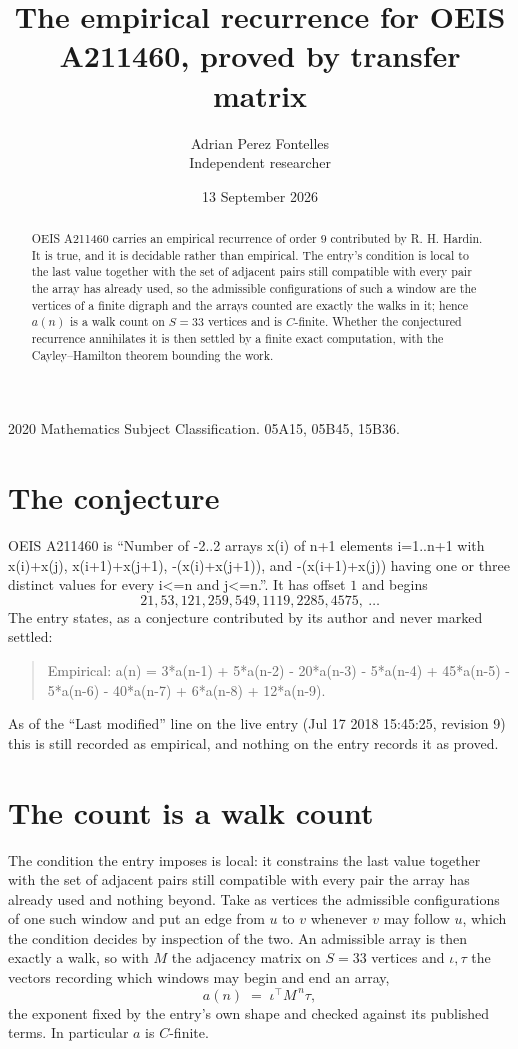 \documentclass[11pt,a4paper]{article}
\title{The empirical recurrence for OEIS A211460, proved by transfer matrix}
\author{Adrian Perez Fontelles\\ \small Independent researcher}
\date{13 September 2026}
\theoremstyle{plain}
\theoremstyle{definition}
\begin{document}
\maketitle

\begin{abstract}
OEIS A211460 carries an empirical recurrence of order $9$ contributed by R. H. Hardin. It is
true, and it is decidable rather than empirical. The entry's condition is local to the last value together with the set of adjacent pairs still compatible with every pair the array has already used, so
the admissible configurations of such a window are the vertices of a finite digraph and the
arrays counted are exactly the walks in it; hence $a(n)$ is a walk count on $S=33$ vertices
and is $C$-finite. Whether the conjectured recurrence annihilates it is then settled by a
finite exact computation, with the Cayley--Hamilton theorem bounding the work.
\end{abstract}

\noindent\small 2020 Mathematics Subject Classification. 05A15, 05B45, 15B36.\normalsize

\section{The conjecture}

OEIS A211460 is ``Number of -2..2 arrays x(i) of n+1 elements i=1..n+1 with x(i)+x(j), x(i+1)+x(j+1), -(x(i)+x(j+1)), and -(x(i+1)+x(j)) having one or three distinct values for every i<=n and j<=n.''. It has offset $1$ and begins
\[
21, 53, 121, 259, 549, 1119, 2285, 4575,\ \dots
\]
The entry states, as a conjecture contributed by its author and never marked settled:
\begin{quote}
Empirical: a(n) = 3*a(n-1) + 5*a(n-2) - 20*a(n-3) - 5*a(n-4) + 45*a(n-5) - 5*a(n-6) - 40*a(n-7) + 6*a(n-8) + 12*a(n-9).
\end{quote}
As of the ``Last modified'' line on the live entry (Jul 17 2018 15:45:25, revision 9) this is still
recorded as empirical, and nothing on the entry records it as proved.

\section{The count is a walk count}

The condition the entry imposes is local: it constrains the last value together with the set of adjacent pairs still compatible with every pair the array has already used and nothing beyond. Take as
vertices the admissible configurations of one such window and put an edge from $u$ to $v$
whenever $v$ may follow $u$, which the condition decides by inspection of the two. An
admissible array is then exactly a walk, so with $M$ the adjacency matrix on $S=33$ vertices
and $\iota,\tau$ the vectors recording which windows may begin and end an array,
\[
a(n)\;=\;\iota^{\!\top}M^{\,n}\tau ,
\]
the exponent fixed by the entry's own shape and checked against its published terms. In
particular $a$ is $C$-finite.
\end{document}
